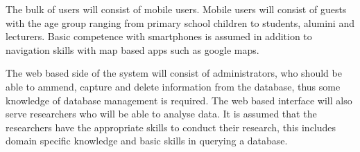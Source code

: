 The bulk of users will consist of mobile users. Mobile users will consist of guests with the age group ranging from primary school children to students, alumini and lecturers. Basic competence with smartphones is assumed in addition to navigation skills with map based apps such as google maps.

The web based side of the system will consist of administrators, who should be able to ammend, capture and delete information from the database, thus some knowledge of database management is required. The web based interface will also serve researchers who will be able to analyse data. It is assumed that the researchers have the appropriate skills to conduct their research, this includes domain specific knowledge and basic skills in querying a database.
